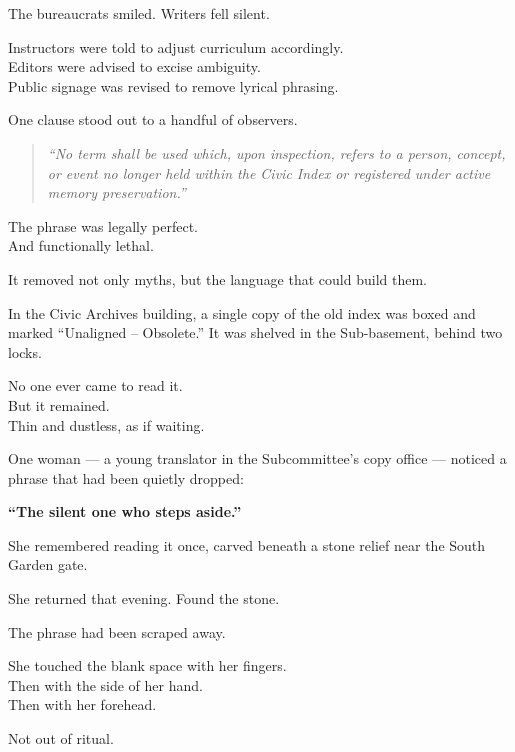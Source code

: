 \documentclass[9pt]{article}
\begin{document}
The bureaucrats smiled. Writers fell silent.

Instructors were told to adjust curriculum accordingly.\\
Editors were advised to excise ambiguity.\\
Public signage was revised to remove lyrical phrasing.

\vspace{1em}

One clause stood out to a handful of observers.

\begin{quote}
\textit{“No term shall be used which, upon inspection, refers to a person, concept, or event no longer held within the Civic Index or registered under active memory preservation.”}
\end{quote}

The phrase was legally perfect.\\
And functionally lethal.

It removed not only myths, but the language that could build them.

\vspace{1em}

In the Civic Archives building, a single copy of the old index was boxed and marked “Unaligned – Obsolete.” It was shelved in the Sub-basement, behind two locks.

No one ever came to read it.\\
But it remained.\\
Thin and dustless, as if waiting.

\vspace{1em}

One woman --- a young translator in the Subcommittee’s copy office --- noticed a phrase that had been quietly dropped:

\begin{center}
\textbf{“The silent one who steps aside.”}
\end{center}

She remembered reading it once, carved beneath a stone relief near the South Garden gate.

She returned that evening. Found the stone.

The phrase had been scraped away.

She touched the blank space with her fingers.\\
Then with the side of her hand.\\
Then with her forehead.

Not out of ritual.
\end{document}
